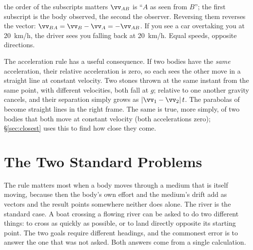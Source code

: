 \begin{trapbox}{the order of the subscripts matters}
$\vv_{AB}$ is ``$A$ as seen from $B$''; the first subscript is the body observed, the second the
observer. Reversing them reverses the vector: $\vv_{BA}=\vv_B-\vv_A=-\vv_{AB}$. If you see a car
overtaking you at \SI{20}{km/h}, the driver sees you falling back at \SI{20}{km/h}. Equal speeds,
opposite directions.
\end{trapbox}

The acceleration rule has a useful consequence. If two bodies have the \emph{same} acceleration,
their relative acceleration is zero, so each sees the other move in a straight line at constant
velocity. Two stones thrown at the same instant from the same point, with different velocities, both
fall at $g$; relative to one another gravity cancels, and their separation simply grows as
$|\vv_1-\vv_2|\,t$. The parabolas of  become straight lines in the right frame.
The same is true, more simply, of two bodies that both move at constant velocity (both accelerations
zero); \S\ref{sec:closest} uses this to find how close they come.

\begin{figure}[htbp]
\centering
{}
\end{figure}

\section{The Two Standard Problems}

The rule matters most when a body moves through a medium that is itself moving, because then the
body's own effort and the medium's drift add as vectors and the result points somewhere neither does
alone. The river is the standard case. A boat crossing a flowing river can be asked to do two different things: to cross as quickly as possible, or
to land directly opposite its starting point. The two goals require different headings, and the commonest
error is to answer the one that was not asked. Both answers come from a single calculation.

